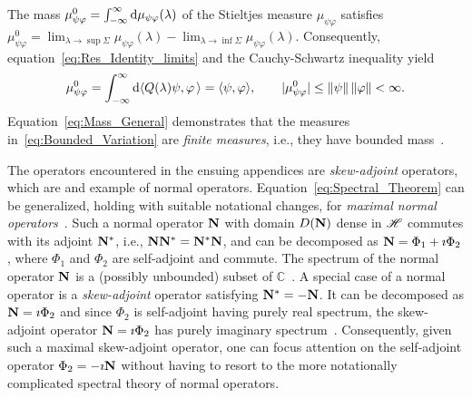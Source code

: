 \documentclass[amsa]{ipart}
\begin{document}
The mass $\mu^0_{\psi\varphi}=\int_{-\infty}^\infty\mathrm{d}\mu_{\psi\varphi}(\lambda)$ of the
Stieltjes measure $\mu_{\psi\varphi}$ satisfies~\cite{Stone:64}
$\mu^0_{\psi\varphi}=\lim_{\lambda\to\sup\Sigma}\mu_{\psi\varphi}(\lambda)-\lim_{\lambda\to\inf\Sigma}\mu_{\psi\varphi}(\lambda)$. Consequently,
equation~\eqref{eq:Res_Identity_limits} and the Cauchy-Schwartz
inequality yield
% 
\begin{align}\label{eq:Mass_General}
  \mu^0_{\psi\varphi}=\int_{-\infty}^\infty\d\langle Q(\lambda)\psi,\varphi\,\rangle=\langle\psi,\varphi\rangle,
  \qquad
  |\mu^0_{\psi\varphi}|\leq\|\psi\|\,\|\varphi\|<\infty.
\end{align}
%
Equation~\eqref{eq:Mass_General} demonstrates that the measures
in~\eqref{eq:Bounded_Variation} are \emph{finite measures}, i.e., they
have bounded mass~\cite{Stone:64}.



The operators encountered in the ensuing appendices are
\emph{skew-adjoint} operators, which are and example of normal
operators. 
Equation~\eqref{eq:Spectral_Theorem} can be generalized, holding with
suitable notational changes, for \emph{maximal normal
  operators}~\cite{Stone:64}. Such a normal operator $\mathbf{N}$ with domain
$D(\mathbf{N})$ dense in $\mathscr{H}$ commutes with its adjoint $\mathbf{N}^*$, i.e., 
$\mathbf{N}\mathbf{N}^*=\mathbf{N}^*\mathbf{N}$, and can be decomposed as $\mathbf{N}=\Phi_1+\imath\Phi_2$, where
$\Phi_1$ and $\Phi_2$ are self-adjoint and commute. The spectrum of the
normal operator $\mathbf{N}$ is 
a (possibly unbounded) subset of $\mathbb{C}$~\cite{Stone:64}. A
special case of a normal operator is a \emph{skew-adjoint} operator
satisfying $\mathbf{N}^*=-\mathbf{N}$. It can be decomposed as $\mathbf{N}=\imath\Phi_2$ and since
$\Phi_2$ is self-adjoint having purely real spectrum, the skew-adjoint
operator $\mathbf{N}=\imath\Phi_2$ has purely imaginary
spectrum~\cite{Stone:64}. Consequently, given such a maximal
skew-adjoint operator, one can focus attention on the self-adjoint
operator $\Phi_2=-\imath\mathbf{N}$ without having to resort to the more notationally
complicated spectral theory of normal operators.
\end{document}
